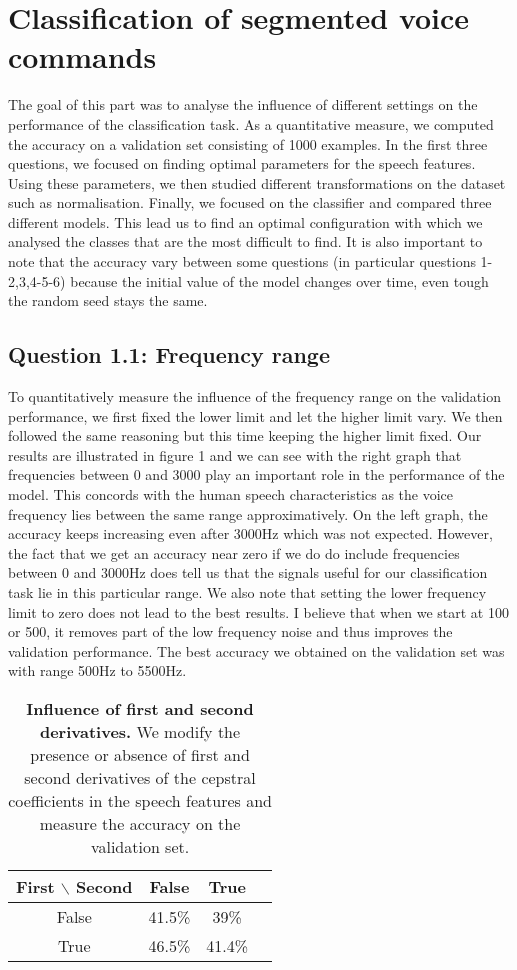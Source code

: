 \documentclass[9pt,twocolumn,letterpaper]{article}
\begin{document}
\section{Classification of segmented voice commands}
The goal of this part was to analyse the influence of different settings on the performance of the classification task. As a quantitative measure, we computed the accuracy on a validation set consisting of 1000 examples. In the first three questions, we focused on finding optimal parameters for the speech features. Using these parameters, we then studied different transformations on the dataset such as normalisation. Finally, we focused on the classifier and compared three different models. This lead us to find an optimal configuration with which we analysed the classes that are the most difficult to find. It is also important to note that the accuracy vary between some questions (in particular questions 1-2,3,4-5-6) because the initial value of the model changes over time, even tough the random seed stays the same.

 

\subsection{Question 1.1: Frequency range}
To quantitatively measure the influence of the frequency range on the validation performance, we first fixed the lower limit and let the higher limit vary. We then followed the same reasoning but this time keeping the higher limit fixed. Our results are illustrated in figure 1 and we can see with the right graph that frequencies between 0 and 3000 play an important role in the performance of the model. This concords with the human speech characteristics as the voice frequency lies between the same range approximatively. On the left graph, the accuracy keeps increasing even after 3000Hz which was not expected. However, the fact that we get an accuracy near zero if we do do include frequencies between 0 and 3000Hz does tell us that the signals useful for our classification task lie in this particular range. We also note that setting the lower frequency limit to zero does not lead to the best results. I believe that when we start at 100 or 500, it removes part of the low frequency noise and thus improves the validation performance. The best accuracy we obtained on the validation set was with range 500Hz to 5500Hz.

\begin{table}
\begin{center}
\begin{tabular}{|c|c|c|c|}
\hline
 First $\backslash$ Second & False & True\\
 \hline
 False & 41.5\% & 39\%\\
 \hline
 True & 46.5\% & 41.4\% \\
 \hline
\end{tabular}
\end{center}
\caption{{\bf Influence of first and second derivatives.} We modify the presence or absence of first and second derivatives of the cepstral coefficients in the speech features and measure the accuracy on the validation set.}
\end{table}
\end{document}
